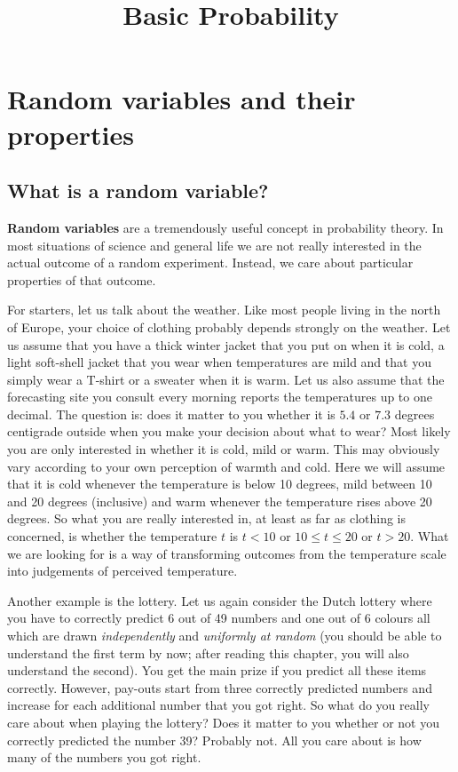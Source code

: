 \documentclass[a4paper,11pt,leqno]{report}
\title{Basic Probability}
\date{}
\begin{document}
\setcounter{chapter}{2}

\chapter{Random variables and their properties}

\section{What is a random variable?}
\textbf{Random variables} are a tremendously useful concept in probability theory. In most situations of
science and general life we are not really interested in the actual outcome of a random experiment. Instead,
we care about particular properties of that outcome.

For starters, let us talk about the weather. 
Like most people living in the north of Europe, your choice of clothing
probably depends strongly on the weather. Let us assume that you have a thick winter jacket that you
put on when it is cold, a light soft-shell jacket that you wear when temperatures are mild and that you
simply wear a T-shirt or a sweater when it is warm. Let us also assume that the forecasting site you
consult every morning reports the temperatures up to one decimal. The question is: does it matter to you
whether it is $ 5.4 $ or $ 7.3 $ degrees centigrade outside when you make your decision about what to wear?
Most likely you are only interested in whether it is cold, mild or warm. This may obviously vary according
to your own perception of warmth and cold. Here we will assume that it is cold whenever the temperature
is below 10 degrees, mild between 10 and 20 degrees (inclusive) and warm whenever the temperature rises
above 20 degrees. So what you are really interested in, at least as far as clothing is concerned, is 
whether the temperature $ t $ is $ t < 10 $ or $ 10 \leq t \leq 20 $ or $ t > 20 $. What we are looking for
is a way of transforming outcomes from the temperature scale into judgements of perceived temperature.

Another example is the lottery. Let us again consider the Dutch lottery where you have to correctly 
predict 6 out of 49 numbers and one out of 6 colours all which are drawn \textit{independently} 
and \textit{uniformly at random} (you should be able to understand the first term by now; after reading
this chapter, you will also understand the second). You get the main prize if you predict all these items
correctly. However, pay-outs start from three correctly predicted numbers and increase for each additional
number that you got right. So what do you really care about when playing the lottery? Does it matter to
you whether or not you correctly predicted the number 39? Probably not. All you care about is how many of
the numbers you got right.
\end{document}
